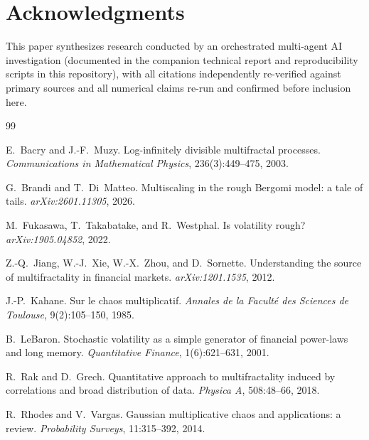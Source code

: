 \documentclass[11pt]{article}
\begin{document}
\section*{Acknowledgments}
This paper synthesizes research conducted by an orchestrated multi-agent AI investigation (documented in the companion technical report and reproducibility scripts in this repository), with all citations independently re-verified against primary sources and all numerical claims re-run and confirmed before inclusion here.


\begin{thebibliography}{99}

E.~Bacry and J.-F.~Muzy.
\newblock Log-infinitely divisible multifractal processes.
\newblock \emph{Communications in Mathematical Physics}, 236(3):449--475, 2003.

G.~Brandi and T.~Di~Matteo.
\newblock Multiscaling in the rough Bergomi model: a tale of tails.
\newblock \emph{arXiv:2601.11305}, 2026.

M.~Fukasawa, T.~Takabatake, and R.~Westphal.
\newblock Is volatility rough?
\newblock \emph{arXiv:1905.04852}, 2022.

Z.-Q.~Jiang, W.-J.~Xie, W.-X.~Zhou, and D.~Sornette.
\newblock Understanding the source of multifractality in financial markets.
\newblock \emph{arXiv:1201.1535}, 2012.

J.-P.~Kahane.
\newblock Sur le chaos multiplicatif.
\newblock \emph{Annales de la Facult\'e des Sciences de Toulouse}, 9(2):105--150, 1985.

B.~LeBaron.
\newblock Stochastic volatility as a simple generator of financial power-laws and long memory.
\newblock \emph{Quantitative Finance}, 1(6):621--631, 2001.

R.~Rak and D.~Grech.
\newblock Quantitative approach to multifractality induced by correlations and broad distribution of data.
\newblock \emph{Physica A}, 508:48--66, 2018.

R.~Rhodes and V.~Vargas.
\newblock Gaussian multiplicative chaos and applications: a review.
\newblock \emph{Probability Surveys}, 11:315--392, 2014.


\end{thebibliography}
\end{document}

